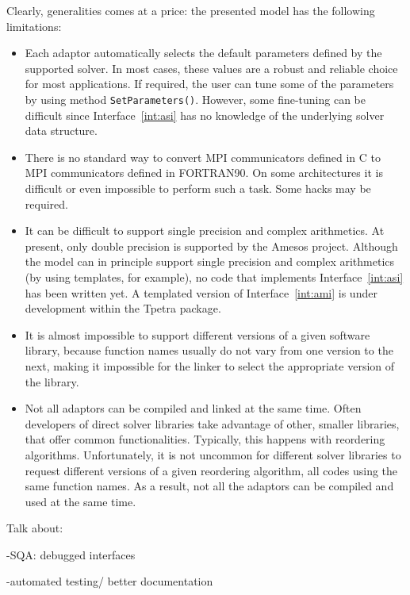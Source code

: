 \documentclass[acmtocl]{acmtrans2m}
\begin{document}
Clearly,  generalities comes at a price: the presented model has the following
limitations:
\begin{itemize}
\item 
Each adaptor automatically selects the default parameters defined by the
supported solver. In most cases, these values are a robust and reliable choice
for most applications. If required, the user can tune some of the parameters
by using method \verb!SetParameters()!. However, some fine-tuning can be
difficult since Interface~\ref{int:asi} has no knowledge of the underlying
solver data structure.

\item There
  is no standard way to 
  convert MPI communicators defined in C to MPI communicators defined
  in FORTRAN90. On some architectures it is difficult or even
  impossible to perform such a task. Some hacks may be required.

\item It can be difficult to support single precision and complex arithmetics.
At present, only double precision is supported by the Amesos project. 
Although the model can in
principle support single precision and complex arithmetics 
(by using templates, for example), no code
that implements Interface~\ref{int:asi} has been written yet. A templated
version of Interface~\ref{int:ami} is under development within the Tpetra
package.

\item 
It is almost impossible to support different versions of a given software
library, because
function names usually do not vary from one version to the
next, making it impossible for the linker to select the
  appropriate version of the library.

\item 
Not all adaptors can be compiled and linked at the same time. Often
developers of direct solver libraries take advantage of other, smaller
libraries, that offer common functionalities. Typically, this happens with
reordering algorithms. Unfortunately,
  it is not uncommon for different solver libraries to request different
  versions of a given reordering algorithm, all codes using the same function
  names. As a result, not all the adaptors can be compiled and used at the
  same time.
\end{itemize}

\bigskip

Talk about:

-SQA: debugged interfaces

-automated testing/ better documentation


\end{document}
